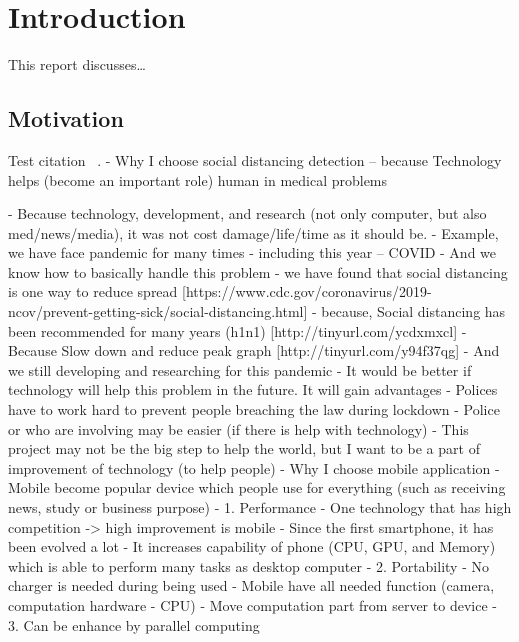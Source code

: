 \chapter{Introduction}\label{intro}
    This report discusses…
    \section{Motivation}

        Test citation ~\cite{BK08}.
        -	Why I choose social distancing detection – because Technology helps (become an important role) human in medical problems

            - Because technology, development, and research (not only computer, but also med/news/media), it was not cost damage/life/time as it should be.
                - Example, we have face pandemic for many times - including this year – COVID
                - And we know how to basically handle this problem
                    - we have found that social distancing is one way to reduce spread [https://www.cdc.gov/coronavirus/2019-ncov/prevent-getting-sick/social-distancing.html]
                    - because, Social distancing has been recommended for many years (h1n1) [http://tinyurl.com/ycdxmxcl]
                    - Because Slow down and reduce peak graph [http://tinyurl.com/y94f37qg]
                - And we still developing and researching for this pandemic
            - It would be better if technology will help this problem in the future. It will gain advantages
                - Polices have to work hard to prevent people breaching the law during lockdown
                - Police or who are involving may be easier (if there is help with technology)
            - This project may not be the big step to help the world, but I want to be a part of improvement of technology (to help people)
        -	Why I choose mobile application
            - Mobile become popular device which people use for everything (such as receiving news, study or business purpose)
            - 1. Performance
                - One technology that has high competition -> high improvement is mobile
                - Since the first smartphone, it has been evolved a lot
                - It increases capability of phone (CPU, GPU, and Memory) which is able to perform many tasks as desktop computer
            - 2. Portability
                - No charger is needed during being used
                - Mobile have all needed function (camera, computation hardware - CPU)
                - Move computation part from server to device
            - 3. Can be enhance by parallel computing


